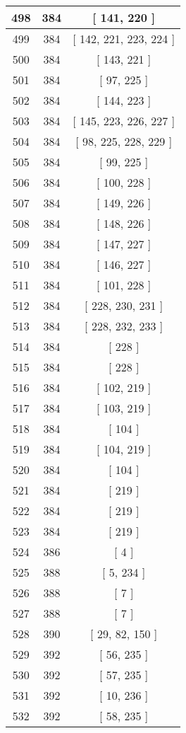 \begin{center}
\begin{longtable}[H]{|| c c c ||}
\hline
498 & 384 & [ 141, 220 ] \\ 
\hline
499 & 384 & [ 142, 221, 223, 224 ] \\ 
\hline
500 & 384 & [ 143, 221 ] \\ 
\hline
501 & 384 & [ 97, 225 ] \\ 
\hline
502 & 384 & [ 144, 223 ] \\ 
\hline
503 & 384 & [ 145, 223, 226, 227 ] \\ 
\hline
504 & 384 & [ 98, 225, 228, 229 ] \\ 
\hline
505 & 384 & [ 99, 225 ] \\ 
\hline
506 & 384 & [ 100, 228 ] \\ 
\hline
507 & 384 & [ 149, 226 ] \\ 
\hline
508 & 384 & [ 148, 226 ] \\ 
\hline
509 & 384 & [ 147, 227 ] \\ 
\hline
510 & 384 & [ 146, 227 ] \\ 
\hline
511 & 384 & [ 101, 228 ] \\ 
\hline
512 & 384 & [ 228, 230, 231 ] \\ 
\hline
513 & 384 & [ 228, 232, 233 ] \\ 
\hline
514 & 384 & [ 228 ] \\ 
\hline
515 & 384 & [ 228 ] \\ 
\hline
516 & 384 & [ 102, 219 ] \\ 
\hline
517 & 384 & [ 103, 219 ] \\ 
\hline
518 & 384 & [ 104 ] \\ 
\hline
519 & 384 & [ 104, 219 ] \\ 
\hline
520 & 384 & [ 104 ] \\ 
\hline
521 & 384 & [ 219 ] \\ 
\hline
522 & 384 & [ 219 ] \\ 
\hline
523 & 384 & [ 219 ] \\ 
\hline
524 & 386 & [ 4 ] \\ 
\hline
525 & 388 & [ 5, 234 ] \\ 
\hline
526 & 388 & [ 7 ] \\ 
\hline
527 & 388 & [ 7 ] \\ 
\hline
528 & 390 & [ 29, 82, 150 ] \\ 
\hline
529 & 392 & [ 56, 235 ] \\ 
\hline
530 & 392 & [ 57, 235 ] \\ 
\hline
531 & 392 & [ 10, 236 ] \\ 
\hline
532 & 392 & [ 58, 235 ] \\ 

\end{longtable}
\end{center}
